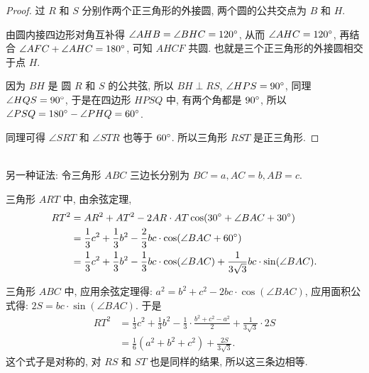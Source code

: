 \begin{figure*}[htbp]
\begin{minipage}[t]{0.49\linewidth}
\end{minipage}
\end{figure*}

\begin{proof}
过 $ R $ 和 $ S $ 分别作两个正三角形的外接圆, 两个圆的公共交点为 $ B $ 和 $ H $. 

由圆内接四边形对角互补得 $ \angle AHB = \angle BHC = 120 \degree $, 从而 $ \angle AHC = 120\degree $, 再结合 $ \angle AFC + \angle AHC = 180 \degree $, 可知 $ AHCF $ 共圆. 也就是三个正三角形的外接圆相交于点 $ H $.

因为 $ BH $ 是 圆 $ R $ 和 $ S $ 的公共弦, 所以 $ BH \perp RS $, $ \angle HPS = 90\degree $, 同理 $ \angle HQS = 90\degree $, 于是在四边形 $ HPSQ $ 中, 有两个角都是 $ 90\degree $, 所以 $ \angle PSQ = 180\degree-\angle PHQ= 60\degree $.

同理可得 $ \angle SRT $ 和 $ \angle STR $ 也等于 $ 60\degree $. 所以三角形 $ RST $ 是正三角形.
\end{proof}
~\\
\noindent 另一种证法: 令三角形 $ ABC $ 三边长分别为 $ BC = a, AC = b, AB = c $.

三角形 $ ART $ 中, 由余弦定理, 
\begin{align*} 
RT^2 &= AR^2 + AT^2 - 2AR\cdot AT\cos(30\degree+\angle BAC+30\degree)\\
	&= \frac{1}{3}c^2 + \frac{1}{3}b^2 - \frac{2}{3}bc\cdot\cos(\angle BAC + 60\degree)\\
	&= \frac{1}{3}c^2 + \frac{1}{3}b^2 - \frac{1}{3}bc\cdot\cos(\angle BAC) + \frac{1}{3\sqrt{3}}bc\cdot\sin(\angle BAC).
\end{align*}

三角形 $ ABC $ 中, 应用余弦定理得: $ a^2 = b^2 + c^2 - 2bc\cdot\cos(\angle BAC) $, 应用面积公式得: $ 2S = bc\cdot\sin(\angle BAC) $. 于是
\begin{align*} 
RT^2 &= \frac{1}{3}c^2 + \frac{1}{3}b^2 - \frac{1}{3}\cdot\frac{b^2+c^2-a^2}{2} + \frac{1}{3\sqrt{3}}\cdot 2S\\
	&= \frac{1}{6}(a^2+b^2+c^2)+\frac{2S}{3\sqrt{3}}.
\end{align*}
这个式子是对称的, 对 $ RS $ 和 $ ST $ 也是同样的结果, 所以这三条边相等.

